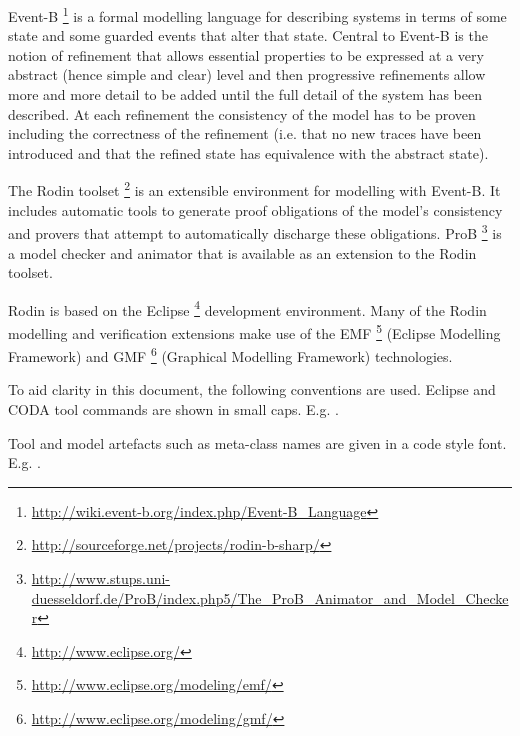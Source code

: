 Event-B%
\footnote{%
  \url{http://wiki.event-b.org/index.php/Event-B_Language}
} %
is a formal modelling language for describing systems in terms of some state and some guarded events that alter that state. Central to Event-B is the notion of refinement that allows essential properties to be expressed at a very abstract (hence simple and clear) level and then progressive refinements allow more and more detail to be added until the full detail of the system has been described. At each refinement the consistency of the model has to be proven including the correctness of the refinement (i.e. that no new traces have been introduced and that the refined state has equivalence with the abstract state).

The Rodin toolset%
\footnote{%
  \url{http://sourceforge.net/projects/rodin-b-sharp/}
} %
is an extensible environment for modelling with Event-B. It includes automatic tools to generate proof obligations of the model’s consistency and provers that attempt to automatically discharge these obligations. ProB%
\footnote{%
  \url{http://www.stups.uni-duesseldorf.de/ProB/index.php5/The_ProB_Animator_and_Model_Checker}
} %
is a model checker and animator that is available as an extension to the Rodin toolset.

Rodin is based on the Eclipse%
\footnote{%
  \url{http://www.eclipse.org/}
} %
development environment. Many of the Rodin modelling and verification extensions make use of the EMF%
\footnote{%
  \url{http://www.eclipse.org/modeling/emf/}
} %
(Eclipse Modelling Framework) and GMF%
\footnote{%
  \url{http://www.eclipse.org/modeling/gmf/}
} %
(Graphical Modelling Framework) technologies.

To aid clarity in this document, the following conventions are used. Eclipse and CODA tool commands are shown in small caps. E.g. .

Tool and model artefacts such as meta-class names are given in a code style font. E.g. .


